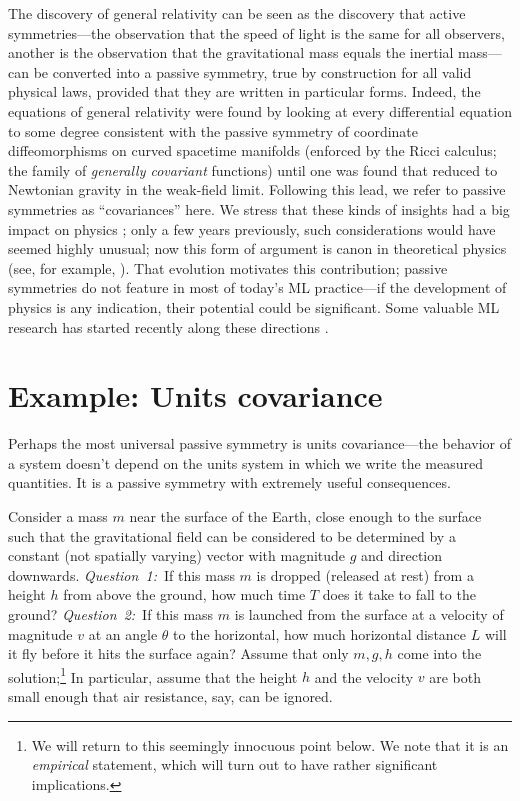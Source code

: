 \documentclass{article} %
\begin{document}
The discovery of general relativity \citep{gr} can be seen as the discovery that active symmetries---the observation that the speed of light is the same for all observers, another is the observation that the gravitational mass equals the inertial mass---can be converted into a passive symmetry, true by construction for all valid physical laws, provided that they are written in particular forms.
Indeed, the equations of general relativity were found by looking at every differential equation to some degree consistent with the passive symmetry of coordinate diffeomorphisms on curved spacetime manifolds (enforced by the Ricci calculus; the family of \emph{generally covariant} functions) until one was found that reduced to Newtonian gravity in the weak-field limit.
Following this lead, we refer to passive symmetries as ``covariances'' here.
We stress that these kinds of insights had a big impact on physics \citep{EARMAN1978251};
only a few years previously, such considerations would have seemed highly unusual;
now this form of argument is canon in theoretical physics (see, for example, \citealt{zee2016group}).
That evolution motivates this contribution; passive symmetries do not feature in most of today's ML practice---if the development of physics is any indication, their potential could be significant.
Some valuable ML research has started recently along these directions \citep{weiler, bronstein2021geometric}.

\section{Example: Units covariance}\label{sec:units}
Perhaps the most universal passive symmetry is units covariance---the behavior of a system doesn't depend on the units system in which we write the measured quantities.
It is a passive symmetry with extremely useful consequences.

Consider a mass $m$ near the surface of the Earth, close enough to the surface such that the gravitational field can be considered to be determined by a constant (not spatially varying) vector with magnitude $g$ and direction downwards.
\textsl{Question~1:}~If this mass $m$ is dropped (released at rest) from a height $h$ from above the ground, how much time $T$ does it take to fall to the ground?
\textsl{Question~2:}~If this mass $m$ is launched from the surface at a velocity of magnitude $v$ at an angle $\theta$ to the horizontal, how much horizontal distance $L$ will it fly before it hits the surface again?
Assume that only $m, g, h$ come into the solution;\footnote{We will return to this seemingly innocuous point below. We note that it is an \emph{empirical} statement, which will turn out to have rather significant implications.} In particular, assume that the height $h$ and the velocity $v$ are both small enough that air resistance, say, can be ignored.
\end{document}
